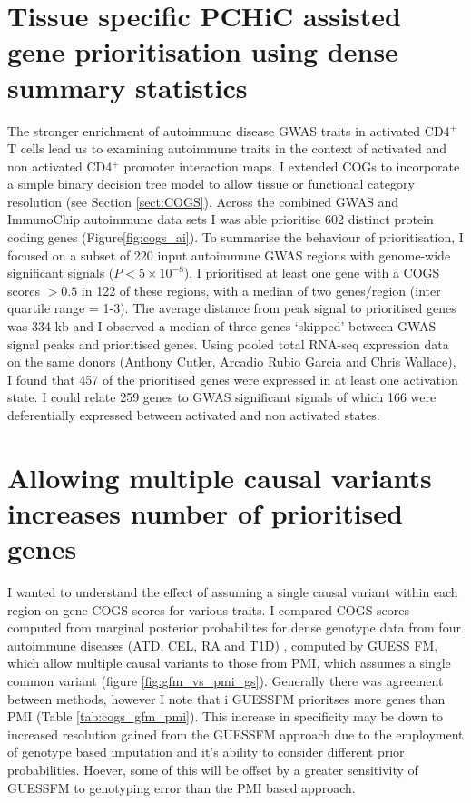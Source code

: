 \documentclass[a4paper,11pt]{report}
\begin{document}
\section{Tissue specific PCHiC assisted gene prioritisation using dense summary statistics}
The stronger enrichment of autoimmune disease GWAS traits in activated CD4$^+$ T cells lead us to examining autoimmune traits in the context of activated and non activated CD4$^{+}$ promoter interaction maps. I extended COGs to  incorporate a simple binary decision tree model to allow tissue or functional category resolution (see Section \ref{sect:COGS}).  Across the combined GWAS and ImmunoChip autoimmune data sets I was able prioritise 602 distinct protein coding genes  (Figure\ref{fig:cogs_ai}). To summarise the behaviour of prioritisation, I focused on a subset of 220 input autoimmune GWAS regions with genome-wide significant signals ($P<5 \times 10^{-8}$). I prioritised at least one gene with a COGS scores $>0.5$ in 122 of these regions, with a median of two genes/region (inter quartile range = 1-3). The average distance from peak signal to prioritised genes was 334 kb and I observed a median of three genes `skipped' between GWAS signal peaks and prioritised genes. Using pooled total RNA-seq expression data on the same donors (Anthony Cutler, Arcadio Rubio Garcia and Chris Wallace), I found that 457 of the prioritised genes were expressed in at least one activation state. I could relate 259 genes to GWAS significant signals of which 166 were deferentially expressed between activated and non activated states.

\section{Allowing multiple causal variants increases number of prioritised genes}
I wanted to understand the effect of assuming a single causal variant within each region on gene COGS scores for various traits. I compared COGS scores computed from marginal posterior probabilites for dense genotype data from four autoimmune diseases (ATD, CEL, RA and T1D) , computed by GUESS FM, which allow multiple causal variants to those from PMI, which assumes a single common variant (figure \ref{fig:gfm_vs_pmi_gs}). Generally there was agreement between methods, however I note that i GUESSFM prioritses more genes than PMI (Table \ref{tab:cogs_gfm_pmi}). This increase in specificity may be down to increased resolution gained from the GUESSFM approach due to the employment of genotype based imputation and it's ability to consider different prior probabilities. Hoever, some of this will be offset by a greater sensitivity of GUESSFM to genotyping error than the PMI based approach.
\end{document}
